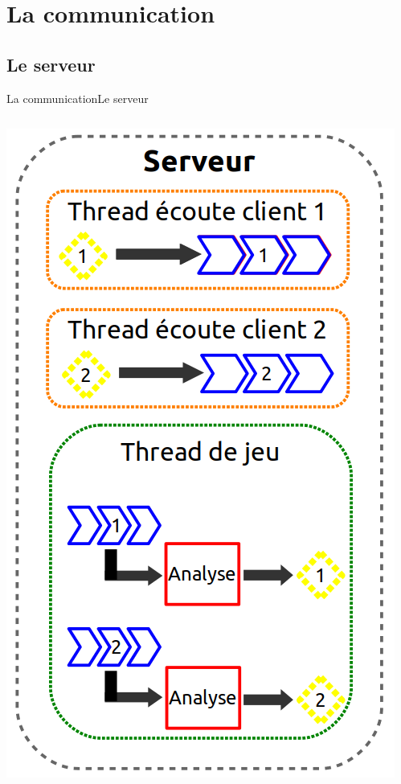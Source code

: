 \documentclass[french]{beamer}
\begin{document}
\section{La communication}

	\subsection{Le serveur}

	\begin{frame}{La communication}{Le serveur}
		\begin{columns}

			\begin{column}{0.4\textwidth}
				\begin{center}
					\includegraphics[scale=0.25]{img/serveur.png}
				\end{center}
			\end{column}



\end{columns}
\end{frame}
\end{document}
